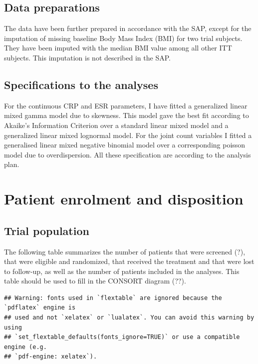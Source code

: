 \documentclass[
]{article}
\begin{document}
\subsection{Data preparations}\label{data-preparations}

The data have been further prepared in accordance with the SAP, except
for the imputation of missing baseline Body Mass Index (BMI) for two
trial subjects. They have been imputed with the median BMI value among
all other ITT subjects. This imputation is not described in the SAP.

\subsection{Specifications to the
analyses}\label{specifications-to-the-analyses}

For the continuous CRP and ESR parameters, I have fitted a generalized
linear mixed gamma model due to skewness. This model gave the best fit
according to Akaike's Information Criterion over a standard linear mixed
model and a generalized linear mixed lognormal model. For the joint
count variables I fitted a generalised linear mixed negative binomial
model over a corresponding poisson model due to overdispersion. All
these specification are according to the analysis plan.

\section{Patient enrolment and
disposition}\label{patient-enrolment-and-disposition}

\subsection{Trial population}\label{trial-population}

The following table summarizes the number of patients that were screened
(?), that were eligible and randomized, that received the treatment and
that were lost to follow-up, as well as the number of patients included
in the analyses. This table should be used to fill in the CONSORT
diagram (??).

\begin{verbatim}
## Warning: fonts used in `flextable` are ignored because the `pdflatex` engine is
## used and not `xelatex` or `lualatex`. You can avoid this warning by using
## `set_flextable_defaults(fonts_ignore=TRUE)` or use a compatible engine (e.g.
## `pdf-engine: xelatex`).
\end{verbatim}
\end{document}
